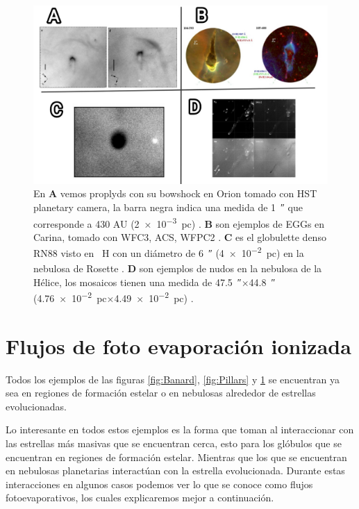 \documentclass{book}
\begin{document}
\begin{figure}[h]
    \centering
    \includegraphics[width=1 \textwidth]{images Chapter 1/C1_Globulettes.jpg}
    \caption{En \textbf{A} vemos proplyds con su bowshock en Orion tomado con HST planetary camera, la barra negra indica una medida de \SI{1}{\arcsecond} que corresponde a 430 AU (\SI{2e-3}{pc}) \citep{Garcia-Arredondo:2001}. \textbf{B} son ejemplos de EGGs en Carina, tomado con WFC3, ACS, WFPC2 \citep{Mesa-Delgado:2016}. \textbf{C} es el globulette denso RN88 visto en \SI{}{H_\alpha} con un diámetro de \SI{6}{\arcsecond} (\SI{4e-2}{pc}) en la nebulosa de Rosette \citep{GFGahm:2013}. \textbf{D} son ejemplos de nudos en la nebulosa de la Hélice, los mosaicos tienen una medida de \SI{47.5}{\arcsecond}$\times$\SI{44.8}{\arcsecond} (\SI{4.76e-2}{pc}$\times$\SI{4.49e-2}{pc}) \citep{O'Dell:2007}. }
    \label{fig:nudos}
\end{figure}



\section{Flujos de foto evaporación ionizada} \label{Sec:fluijos fotoevaporativos}

Todos los ejemplos de las figuras \ref{fig:Banard}, \ref{fig:Pillars} y \ref{fig:nudos} se encuentran ya sea en regiones de formación estelar o en nebulosas alrededor de estrellas evolucionadas. 

Lo interesante en todos estos ejemplos es la forma que toman al interaccionar con las estrellas más masivas que se encuentran cerca, esto para los glóbulos que se encuentran en regiones de formación estelar.  Mientras que los que se encuentran en nebulosas planetarias interactúan con la estrella evolucionada. Durante estas interacciones en algunos casos podemos ver lo que se conoce como flujos fotoevaporativos, los cuales explicaremos mejor a continuación.
\end{document}
